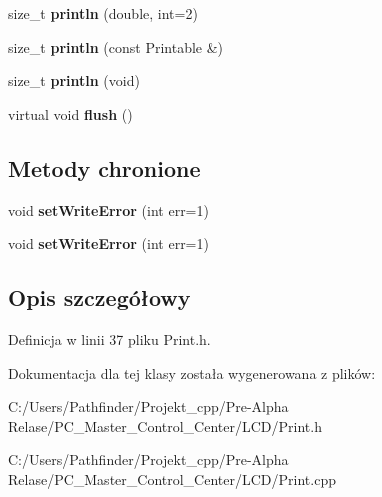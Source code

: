 \begin{DoxyCompactItemize}
size\+\_\+t {\bfseries println} (double, int=2)
\item 
\mbox{\label{class_print_a20f9e104153b62e720c9b4c348b44f00}} 
size\+\_\+t {\bfseries println} (const Printable \&)
\item 
\mbox{\label{class_print_a169b128f9e22f0c15883768f580541a2}} 
size\+\_\+t {\bfseries println} (void)
\item 
\mbox{\label{class_print_add7f8450dfdc7f94eeec685f220573f7}} 
virtual void {\bfseries flush} ()
\end{DoxyCompactItemize}
\subsection*{Metody chronione}
\begin{DoxyCompactItemize}
\item 
\mbox{\label{class_print_a46656410e23c0ec14d7a01b38b3b6f00}} 
void {\bfseries set\+Write\+Error} (int err=1)
\item 
\mbox{\label{class_print_a46656410e23c0ec14d7a01b38b3b6f00}} 
void {\bfseries set\+Write\+Error} (int err=1)
\end{DoxyCompactItemize}


\subsection{Opis szczegółowy}


Definicja w linii 37 pliku Print.\+h.



Dokumentacja dla tej klasy została wygenerowana z plików\+:\begin{DoxyCompactItemize}
\item 
C\+:/\+Users/\+Pathfinder/\+Projekt\+\_\+cpp/\+Pre-\/\+Alpha Relase/\+P\+C\+\_\+\+Master\+\_\+\+Control\+\_\+\+Center/\+L\+C\+D/Print.\+h\item 
C\+:/\+Users/\+Pathfinder/\+Projekt\+\_\+cpp/\+Pre-\/\+Alpha Relase/\+P\+C\+\_\+\+Master\+\_\+\+Control\+\_\+\+Center/\+L\+C\+D/Print.\+cpp\end{DoxyCompactItemize}
